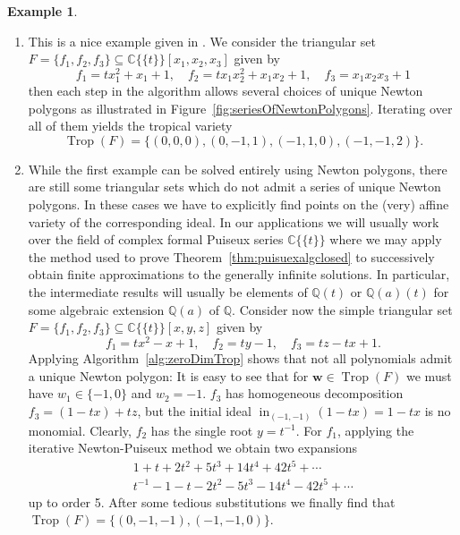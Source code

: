\documentclass[
  paper=a4,
  titlepage,
  bibliography=totoc,
  pagesize=pdftex
]{scrartcl}
\numberwithin{figure}{section}
\numberwithin{equation}{section}
\numberwithin{table}{section}
\newcommand*\setC{\mathds{C}}
\newcommand*\setQ{\mathds{Q}}
\newcommand*\puiseux[2]{#1\{\!\{#2\}\!\}}
\newcommand*\CCt{\puiseux{\setC}{t}}
\let\vec\mathbf
\DeclareMathOperator{\Trop}{Trop}
\DeclareMathOperator{\initial}{in}
\theoremstyle{definition}
\newtheorem{example}[definition]{Example}
\numberwithin{definition}{section}
\begin{document}
\begin{example} \label{ex:zeroDimTrop}\
  \begin{enumerate}
    \item This is a nice example given in \cite[Example~2.13]{tropPointsLinks}. We
      consider the triangular set $F = \{ f_1, f_2, f_3 \} \subseteq \CCt[x_1, x_2, x_3]$
      given by
      \[
        f_1 = tx_1^2 + x_1 + 1, \quad
        f_2 = tx_1x_2^2 + x_1x_2 + 1, \quad
        f_3 = x_1x_2x_3+1
      \]
      then each step in the algorithm allows several choices of unique Newton polygons as
      illustrated in Figure~\ref{fig:seriesOfNewtonPolygons}. Iterating over all of them
      yields the tropical variety
      \[
        \Trop(F) = \{ (0,0,0), (0,-1,1), (-1,1,0),(-1,-1,2) \}.
      \]
    \item While the first example can be solved entirely using Newton polygons, there are
      still some triangular sets which do not admit a series of unique Newton polygons. In
      these cases we have to explicitly find points on the (very) affine variety of the
      corresponding ideal. In our applications we will usually work over the field of
      complex formal Puiseux series $\CCt$ where we may apply the method used to prove
      Theorem~\ref{thm:puisuexalgclosed} to successively obtain finite approximations to
      the generally infinite solutions. In particular, the intermediate results will
      usually be elements of $\setQ(t)$ or $\setQ(a)(t)$ for some algebraic extension
      $\setQ(a)$ of $\setQ$. Consider now the simple triangular set $F = \{ f_1, f_2, f_3
      \} \subseteq \CCt[x,y,z]$ given by
      \[
        f_1 = tx^2 - x + 1, \quad
        f_2 = ty - 1, \quad
        f_3 = tz - tx + 1.
      \]
      Applying Algorithm~\ref{alg:zeroDimTrop} shows that not all polynomials admit a
      unique Newton polygon: It is easy to see that for $\vec w \in \Trop(F)$ we must have
      $w_1 \in \{ -1, 0 \}$ and $w_2 = -1$. $f_3$ has homogeneous decomposition $f_3 = (1
      - tx) + tz$, but the initial ideal $\initial_{(-1,-1)}(1-tx) = 1-tx$ is no monomial.
      Clearly, $f_2$ has the single root $y = t^{-1}$. For $f_1$, applying the iterative
      Newton-Puiseux method we obtain two expansions
      \begin{align*}
        1 + t + 2t^2 + 5t^3 + 14t^4 + 42 t^5 + \cdots \\
        t^{-1} - 1 - t - 2t^2 - 5t^3 - 14t^4 - 42t^5 + \cdots
      \end{align*}
      up to order 5. After some tedious substitutions we finally find that $\Trop(F) = \{
      (0,-1,-1), (-1,-1,0) \}$.
      \label{ex:zdt2}
  \end{enumerate}
\end{example}
\end{document}
